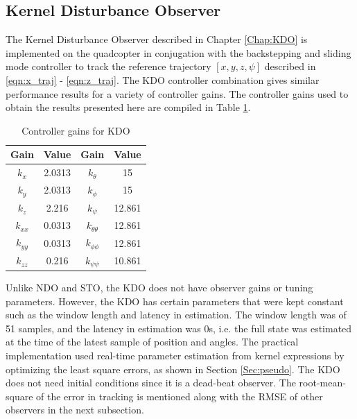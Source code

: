 \documentclass[letterpaper%
, twoside%
, 12pt%
,memoire%
, english%
,creativecommons,hyperref%
]{thETS}
\begin{document}
\FloatBarrier
\subsection{Kernel Disturbance Observer}
The Kernel Disturbance Observer described in Chapter \ref{Chap:KDO} is implemented on the quadcopter in conjugation with the backstepping and sliding mode controller to track the reference trajectory $[x,y,z,\psi]$ described in \eqref{eqn:x_traj} - \eqref{eqn:z_traj}. The KDO controller combination gives similar performance results for a variety of controller gains. The controller gains used to obtain the results presented here are compiled in Table \ref{Tab:realControllerGainsKDO}.

\begin{table}
\parbox{0.65\textwidth}{\caption{Controller gains for KDO}\label{Tab:realControllerGainsKDO}} 
\begin{tabular}{|c|c|c|c|}
\hline
{\bf Gain} & {\bf Value} & {\bf Gain}         & {\bf Value}  \\ \hline
$k_x$      & 2.0313      & $k_\theta$         & 15           \\ \hline
$k_y$      & 2.0313      & $k_\phi$           & 15           \\ \hline
$k_z$      & 2.216       & $k_\psi$           & 12.861       \\ \hline 
$k_{xx}$   & 0.0313      & $k_{\theta\theta}$ & 12.861       \\ \hline
$k_{yy}$   &  0.0313     & $k_{\phi\phi}$     & 12.861       \\ \hline
$k_{zz}$   & 0.216       & $k_{\psi\psi}$     & 10.861       \\ \hline 
\end{tabular}
\end{table}

Unlike NDO and STO, the KDO does not have observer gains or tuning parameters. However, the KDO has certain parameters that were kept constant such as the window length and latency in estimation. The window length was of 51 samples, and the latency in estimation was 0s, i.e. the full state was estimated at the time of the latest sample of position and angles. The practical implementation used real-time parameter estimation from kernel expressions by optimizing the least square errors, as shown in Section \ref{Sec:pseudo}. The KDO does not need initial conditions since it is a dead-beat observer. The root-mean-square of the error in tracking is mentioned along with the RMSE of other observers in the next subsection.
\end{document}
